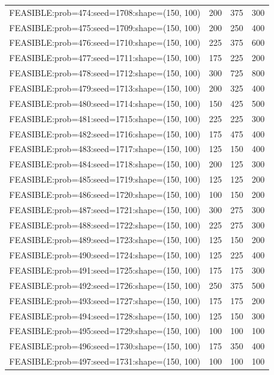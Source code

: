 \begin{longtable}{lccc}
FEASIBLE:prob=474:seed=1708:shape=(150, 100) &  200 &   375 &    300 \\
FEASIBLE:prob=475:seed=1709:shape=(150, 100) &  200 &   250 &    400 \\
FEASIBLE:prob=476:seed=1710:shape=(150, 100) &  225 &   375 &    600 \\
FEASIBLE:prob=477:seed=1711:shape=(150, 100) &  175 &   225 &    200 \\
FEASIBLE:prob=478:seed=1712:shape=(150, 100) &  300 &   725 &    800 \\
FEASIBLE:prob=479:seed=1713:shape=(150, 100) &  200 &   325 &    400 \\
FEASIBLE:prob=480:seed=1714:shape=(150, 100) &  150 &   425 &    500 \\
FEASIBLE:prob=481:seed=1715:shape=(150, 100) &  225 &   225 &    300 \\
FEASIBLE:prob=482:seed=1716:shape=(150, 100) &  175 &   475 &    400 \\
FEASIBLE:prob=483:seed=1717:shape=(150, 100) &  125 &   150 &    400 \\
FEASIBLE:prob=484:seed=1718:shape=(150, 100) &  200 &   125 &    300 \\
FEASIBLE:prob=485:seed=1719:shape=(150, 100) &  125 &   125 &    200 \\
FEASIBLE:prob=486:seed=1720:shape=(150, 100) &  100 &   150 &    200 \\
FEASIBLE:prob=487:seed=1721:shape=(150, 100) &  300 &   275 &    300 \\
FEASIBLE:prob=488:seed=1722:shape=(150, 100) &  225 &   275 &    300 \\
FEASIBLE:prob=489:seed=1723:shape=(150, 100) &  125 &   150 &    200 \\
FEASIBLE:prob=490:seed=1724:shape=(150, 100) &  125 &   225 &    400 \\
FEASIBLE:prob=491:seed=1725:shape=(150, 100) &  175 &   175 &    300 \\
FEASIBLE:prob=492:seed=1726:shape=(150, 100) &  250 &   375 &    500 \\
FEASIBLE:prob=493:seed=1727:shape=(150, 100) &  175 &   175 &    200 \\
FEASIBLE:prob=494:seed=1728:shape=(150, 100) &  125 &   150 &    300 \\
FEASIBLE:prob=495:seed=1729:shape=(150, 100) &  100 &   100 &    100 \\
FEASIBLE:prob=496:seed=1730:shape=(150, 100) &  175 &   350 &    400 \\
FEASIBLE:prob=497:seed=1731:shape=(150, 100) &  100 &   100 &    100 \\

\end{longtable}
